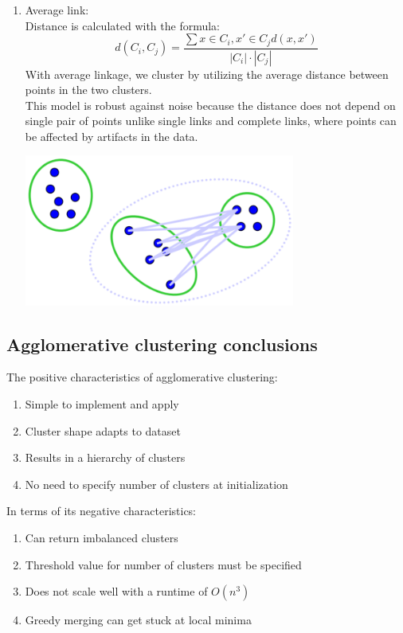 \documentclass{article}
\begin{document}
\begin{enumerate}
	\item Average link:\\
	Distance is calculated with the formula:
	\begin{equation}
	    d(C_i,C_j) = \frac{\sum x \in C_i,x' \in C_j d(x,x')}{|C_i|\cdot |C_j|}
    \end{equation}
    With average linkage, we cluster by utilizing the average distance between points in the two clusters.\\
    This model is robust against noise because the distance does not depend on single pair of points unlike single links and complete links, where points can be affected by artifacts in the data.
    \begin{center}
        \includegraphics[width=0.70\textwidth]{average.png}
    \end{center}
\end{enumerate}

\subsection{Agglomerative clustering conclusions}

The positive characteristics of agglomerative clustering:
\begin{enumerate}
	\item Simple to implement and apply
	\item Cluster shape adapts to dataset
	\item Results in a hierarchy of clusters
	\item No need to specify number of clusters at initialization
\end{enumerate}

In terms of its negative characteristics:
\begin{enumerate}
	\item Can return imbalanced clusters
	\item Threshold value for number of clusters must be specified
	\item Does not scale well with a runtime of $O(n^3)$
	\item Greedy merging can get stuck at local minima
\end{enumerate}
\end{document}
